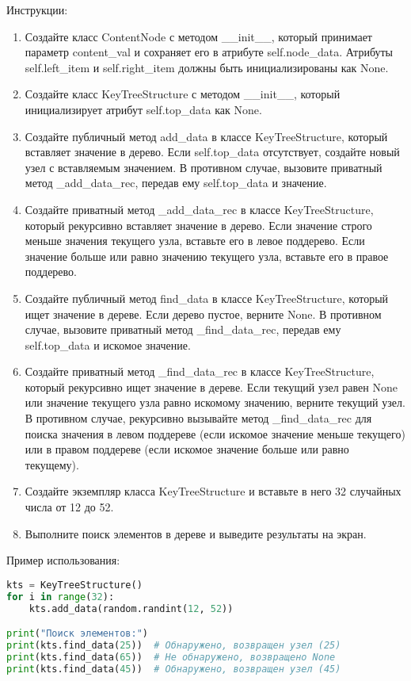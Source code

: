 \begin{enumerate}
Инструкции:
\begin{enumerate}
    \item Создайте класс ContentNode с методом \_\_init\_\_, который принимает параметр content\_val и сохраняет его в атрибуте self.node\_data. Атрибуты self.left\_item и self.right\_item должны быть инициализированы как None.
    \item Создайте класс KeyTreeStructure с методом \_\_init\_\_, который инициализирует атрибут self.top\_data как None.
    \item Создайте публичный метод add\_data в классе KeyTreeStructure, который вставляет значение в дерево. Если self.top\_data отсутствует, создайте новый узел с вставляемым значением. В противном случае, вызовите приватный метод \_add\_data\_rec, передав ему self.top\_data и значение.
    \item Создайте приватный метод \_add\_data\_rec в классе KeyTreeStructure, который рекурсивно вставляет значение в дерево. Если значение строго меньше значения текущего узла, вставьте его в левое поддерево. Если значение больше или равно значению текущего узла, вставьте его в правое поддерево.
    \item Создайте публичный метод find\_data в классе KeyTreeStructure, который ищет значение в дереве. Если дерево пустое, верните None. В противном случае, вызовите приватный метод \_find\_data\_rec, передав ему self.top\_data и искомое значение.
    \item Создайте приватный метод \_find\_data\_rec в классе KeyTreeStructure, который рекурсивно ищет значение в дереве. Если текущий узел равен None или значение текущего узла равно искомому значению, верните текущий узел. В противном случае, рекурсивно вызывайте метод \_find\_data\_rec для поиска значения в левом поддереве (если искомое значение меньше текущего) или в правом поддереве (если искомое значение больше или равно текущему).
    \item Создайте экземпляр класса KeyTreeStructure и вставьте в него 32 случайных числа от 12 до 52.
    \item Выполните поиск элементов в дереве и выведите результаты на экран.
\end{enumerate}

Пример использования:
\begin{lstlisting}[language=Python]
kts = KeyTreeStructure()
for i in range(32):
    kts.add_data(random.randint(12, 52))

print("Поиск элементов:")
print(kts.find_data(25))  # Обнаружено, возвращен узел (25)
print(kts.find_data(65))  # Не обнаружено, возвращено None
print(kts.find_data(45))  # Обнаружено, возвращен узел (45)
\end{lstlisting}


\end{enumerate}
